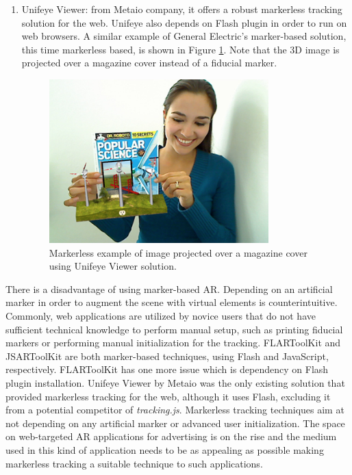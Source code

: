 \begin{enumerate}
    \item Unifeye Viewer: from Metaio company, it offers a robust markerless tracking solution for the web. Unifeye \cite{Metaio2009} also depends on Flash plugin in order to run on web browsers. A similar example of General Electric's marker-based solution, this time markerless based, is shown in Figure \ref{figure:unifeyeviewer}. Note that the 3D image is projected over a magazine cover instead of a fiducial marker.

    \begin{figure}[!htb]
      \centering
      \includegraphics[width=240pt]{chapters/tracking_library_for_the_web/unifeyeviewer.png}
      \caption{Markerless example of image projected over a magazine cover using Unifeye Viewer solution.}
      \label{figure:unifeyeviewer}
    \end{figure}
\end{enumerate}

There is a disadvantage of using marker-based AR. Depending on an artificial marker in order to augment the scene with virtual elements is counterintuitive. Commonly, web applications are utilized by novice users that do not have sufficient technical knowledge to perform manual setup, such as printing fiducial markers or performing manual initialization for the tracking. FLARToolKit and JSARToolKit are both marker-based techniques, using Flash and JavaScript, respectively. FLARToolKit has one more issue which is dependency on Flash plugin installation. Unifeye Viewer by Metaio was the only existing solution that provided markerless tracking for the web, although it uses Flash, excluding it from a potential competitor of \textit{tracking.js}. Markerless tracking techniques aim at not depending on any artificial marker or advanced user initialization. The space on web-targeted AR applications for advertising is on the rise and the medium used in this kind of application needs to be as appealing as possible \cite{Pablo2013} making markerless tracking a suitable technique to such applications.

